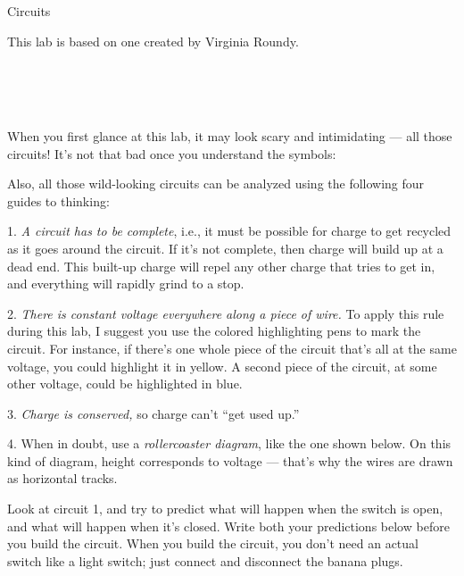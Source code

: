 \begin{lab}{Circuits}

This lab is based on one created by Virginia Roundy.

\apparatus
{}\\
\\
\\


\labintroduction

When you first glance at this lab, it may look scary and intimidating --- all those
circuits! It's not that bad once you understand the symbols:


Also, all those wild-looking circuits can be analyzed using the following four
guides to thinking:

1. \emph{A circuit has to be complete\/}, i.e., it must be possible for charge to get recycled
as it goes around the circuit. If it's not complete, then charge will build up at a dead end. This built-up
charge will repel any other charge that tries to get in, and everything will rapidly grind to a stop.

2. \emph{There is constant voltage everywhere along a piece of wire.} To apply this rule during
this lab, I suggest you use the colored highlighting pens to mark the circuit. For instance, if there's
one whole piece of the circuit that's all at the same voltage, you could highlight it in yellow.
A second piece of the circuit, at some other voltage, could be highlighted in blue.

3. \emph{Charge is conserved,} so charge can't ``get used up.''

4. When in doubt, use a \emph{rollercoaster diagram}, like the one shown below. On this
kind of diagram, height corresponds to voltage --- that's why the wires are drawn as horizontal
tracks.


\vfill\pagebreak[4]



Look at circuit 1, and try to predict what will happen when the switch is open, and what
will happen when it's closed. Write both your predictions below before you build the circuit.
When you build the circuit, you don't need an actual switch like a light switch; just 
connect and disconnect the banana plugs.



\end{lab}
